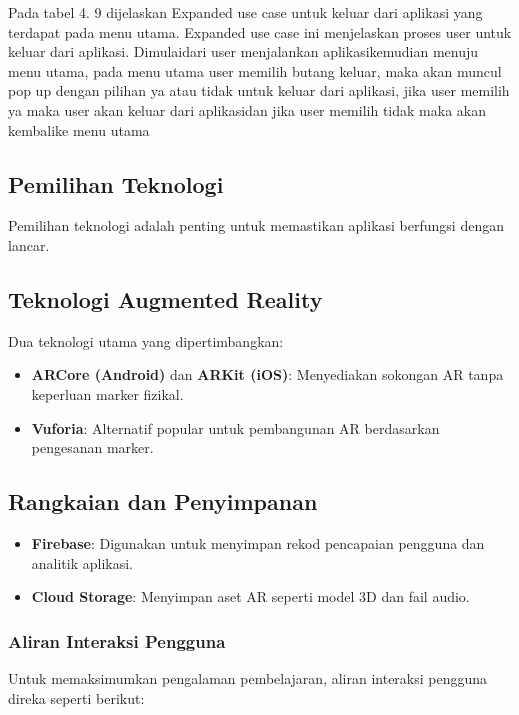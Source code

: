 \begin{itemize}
\begin{itemize}
\begin{itemize}
\begin{itemize}
\begin{itemize}
\begin{itemize}
\begin{itemize}
\begin{itemize}
\begin{flushleft}
Pada  tabel  4. 9  dijelaskan  Expanded  use  case  untuk  keluar  dari   aplikasi  yang terdapat pada menu utama. Expanded use case ini menjelaskan proses user untuk keluar dari aplikasi. Dimulaidari user menjalankan  aplikasikemudian menuju menu utama, pada menu utama user memilih butang keluar, maka akan muncul pop up dengan pilihan ya atau tidak untuk keluar dari aplikasi, jika user memilih ya maka user akan keluar dari aplikasidan jika user memilih tidak maka akan kembalike menu
utama



\subsection{Pemilihan Teknologi}
Pemilihan teknologi adalah penting untuk memastikan aplikasi berfungsi dengan lancar.

\subsection{Teknologi Augmented Reality}
Dua teknologi utama yang dipertimbangkan:
\begin{itemize}[label=\textendash]
    \item \textbf{ARCore (Android)} dan \textbf{ARKit (iOS)}: Menyediakan sokongan AR tanpa keperluan marker fizikal.
    \item \textbf{Vuforia}: Alternatif popular untuk pembangunan AR berdasarkan pengesanan marker.
\end{itemize}

\subsection{Rangkaian dan Penyimpanan}
\begin{itemize}[label=\textendash]
    \item \textbf{Firebase}: Digunakan untuk menyimpan rekod pencapaian pengguna dan analitik aplikasi.
    \item \textbf{Cloud Storage}: Menyimpan aset AR seperti model 3D dan fail audio.
\end{itemize}

\subsubsection{Aliran Interaksi Pengguna}
Untuk memaksimumkan pengalaman pembelajaran, aliran interaksi pengguna direka seperti berikut:


\end{flushleft}
\end{itemize}
\end{itemize}
\end{itemize}
\end{itemize}
\end{itemize}
\end{itemize}
\end{itemize}
\end{itemize}
